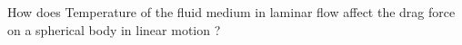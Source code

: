 
{How does Temperature of the fluid medium in laminar flow affect the drag force on a spherical body in linear motion ?}


